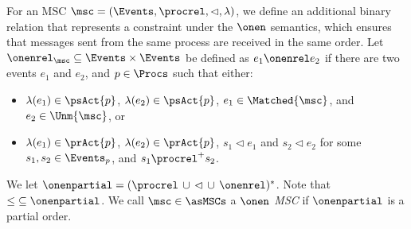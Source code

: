 
\begin{definition} %
For an MSC $\msc = (\Events,\procrel,\lhd,\lambda)$, we define
an additional binary relation that represents a constraint
under the $\onen$ semantics, which ensures that messages sent from the same process are received in the same order. Let ${\onenrel}_\msc \subseteq \Events \times \Events$ be defined as $e_1 \onenrel e_2$ if there are two events $e_1$ and $e_2$, and $p \in \Procs$ such that either:
\begin{itemize}\itemsep=0.5ex
	\item $\lambda(e_1) \in \psAct{p}$, $\lambda(e_2) \in \psAct{p}$, $e_1 \in \Matched{\msc}$, and $e_2 \in \Unm{\msc}$, or
	\item $\lambda(e_1) \in \prAct{p}$, $\lambda(e_2) \in \prAct{p}$, $s_1 \lhd e_1$ and $s_2 \lhd e_2$ for some $s_1,s_2 \in \Events_p$, and $s_1 \procrel^+ s_2$.
\end{itemize}

We let ${\onenpartial} = ({\procrel} \,\cup\, {\lhd} \,\cup\, {\onenrel})^\ast$.
Note that ${\le} \subseteq {\onenpartial}$.
%
	We call $\msc \in \asMSCs$ a \emph{$\onen$ MSC}
	if ${\onenpartial}$ is a partial order.
\end{definition}


